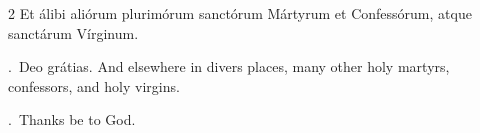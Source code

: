 \begin{paracol}{2}
\rubric{\P} Et álibi aliórum plurimórum sanctórum Mártyrum et Confessórum, atque sanctárum Vírginum.

\textcolor{gregoriocolor}{\Rbar.}~Deo grátias.
\switchcolumn
{}
\rubric{\P} And elsewhere in divers places, many other holy martyrs, confessors, and holy virgins.

\textcolor{gregoriocolor}{\Rbar.}~Thanks be to God.
\switchcolumn*

\end{paracol}
